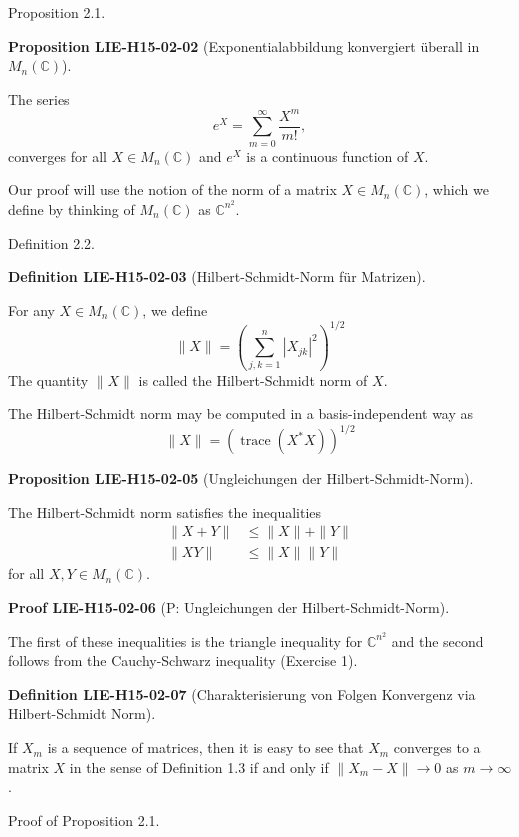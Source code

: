 \documentclass[10pt, letterpaper]{article}
\newcommand{\C}{\mathbb{C}}
\newcommand{\CustomHeading}[3]{%
  \par\medskip\noindent%
  \textbf{#1 #2} \textnormal{(#3)}.\enskip%
}
\newenvironment{DEF}[2]{\begin{unitbox}\CustomHeading{Definition}{#1}{#2}}{\end{unitbox}}
\newenvironment{PROP}[2]{\begin{unitbox}\CustomHeading{Proposition}{#1}{#2}}{\end{unitbox}}
\newenvironment{PROOF}[2]{\begin{unitbox}\CustomHeading{Proof}{#1}{#2}}{\end{unitbox}}
\begin{document}
Proposition 2.1. 


\begin{PROP}{LIE-H15-02-02}{Exponentialabbildung konvergiert überall in $M_n(\C)$}
The series 
$$
e^{X}=\sum_{m=0}^{\infty} \frac{X^{m}}{m!},
$$
converges for all $X \in M_{n}(\mathbb{C})$ and $e^{X}$ is a continuous function of $X$.
\end{PROP}

Our proof will use the notion of the norm of a matrix $X \in M_{n}(\mathbb{C})$, which we define by thinking of $M_{n}(\mathbb{C})$ as $\mathbb{C}^{n^{2}}$.

Definition 2.2. 

\begin{DEF}{LIE-H15-02-03}{Hilbert-Schmidt-Norm für Matrizen}
For any $X \in M_{n}(\mathbb{C})$, we define
$$
\|X\|=\left(\sum_{j, k=1}^{n}\left|X_{j k}\right|^{2}\right)^{1 / 2}
$$
The quantity $\|X\|$ is called the Hilbert-Schmidt norm of $X$.

The Hilbert-Schmidt norm may be computed in a basis-independent way as
$$
\|X\|=\left(\operatorname{trace}\left(X^{*} X\right)\right)^{1 / 2}
$$
\end{DEF}


\begin{PROP}{LIE-H15-02-05}{Ungleichungen der Hilbert-Schmidt-Norm}
The Hilbert-Schmidt norm satisfies the inequalities
$$
\begin{aligned}
\|X+Y\| & \leq\|X\|+\|Y\| \\
\|X Y\| & \leq\|X\|\|Y\|
\end{aligned}
$$
for all $X, Y \in M_{n}(\mathbb{C})$.
\end{PROP}

\begin{PROOF}{LIE-H15-02-06}{P: Ungleichungen der Hilbert-Schmidt-Norm}
The first of these inequalities is the triangle inequality for $\mathbb{C}^{n^{2}}$ and the second follows from the Cauchy-Schwarz inequality (Exercise 1).
\end{PROOF}


\begin{DEF}{LIE-H15-02-07}{Charakterisierung von Folgen Konvergenz via Hilbert-Schmidt Norm}
If $X_{m}$ is a sequence of matrices, then it is easy to see that $X_{m}$ converges to a matrix $X$ in the sense of Definition 1.3 if and only if $\left\|X_{m}-X\right\| \rightarrow 0$ as $m \rightarrow \infty$.
\end{DEF}

Proof of Proposition 2.1. 
\end{document}
